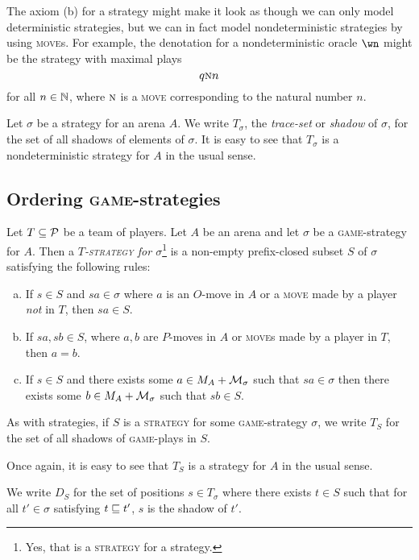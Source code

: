 \documentclass{article}
\newcommand{\game}{\textsc{game}}
\newcommand{\move}{\textsc{move}}
\newcommand{\strategy}{\textsc{strategy}}
\begin{document}
\begin{remark}
  The axiom (b) for a strategy might make it look as though we can only model deterministic strategies, but we can in fact model nondeterministic strategies by using \move{}s.  
  For example, the denotation for a nondeterministic oracle $\wn$ might be the strategy with maximal plays
  \[
    q\textsc{n}n
    \]
  for all $n\in\bN$, where $\textsc{n}$ is a \move{} corresponding to the natural number $n$.
\end{remark}

\begin{definition}
  Let $\sigma$ be a strategy for an arena $A$.  
  We write $T_\sigma$, the \emph{trace-set} or \emph{shadow} of $\sigma$, for the set of all shadows of elements of $\sigma$.  
  It is easy to see that $T_\sigma$ is a nondeterministic strategy for $A$ in the usual sense.  
\end{definition}

\subsection{Ordering \game{}-strategies}

\begin{definition}
  Let $T\subset \P$ be a team of players.  
  Let $A$ be an arena and let $\sigma$ be a \game{}-strategy for $A$.  
  Then a \emph{$T$-\strategy{} for $\sigma$}\footnote{Yes, that is a \strategy{} for a strategy.} is a non-empty prefix-closed subset $S$ of $\sigma$ satisfying the following rules:
  \begin{enumerate}[a)]
    \item If $s\in S$ and $sa\in\sigma$ where $a$ is an $O$-move in $A$ or a \move{} made by a player \emph{not} in $T$, then $sa\in S$.  
    \item If $sa,sb\in S$, where $a,b$ are $P$-moves in $A$ or \move{}s made by a player in $T$, then $a=b$.  
    \item If $s\in S$ and there exists some $a\in M_A+\M_\sigma$ such that $sa\in \sigma$ then there exists some $b\in M_A+\M_\sigma$ such that $sb\in S$.
  \end{enumerate}
\end{definition}

\begin{definition}
  As with strategies, if $S$ is a \strategy{} for some \game{}-strategy $\sigma$, we write $T_S$ for the set of all shadows of \game{}-plays in $S$.  

  Once again, it is easy to see that $T_S$ is a strategy for $A$ in the usual sense.  

  We write $D_S$ for the set of positions $s\in T_\sigma$ where there exists $t\in S$ such that for all $t'\in\sigma$ satisfying $t\prefix t'$, $s$ is the shadow of $t'$.  
\end{definition}
\end{document}
